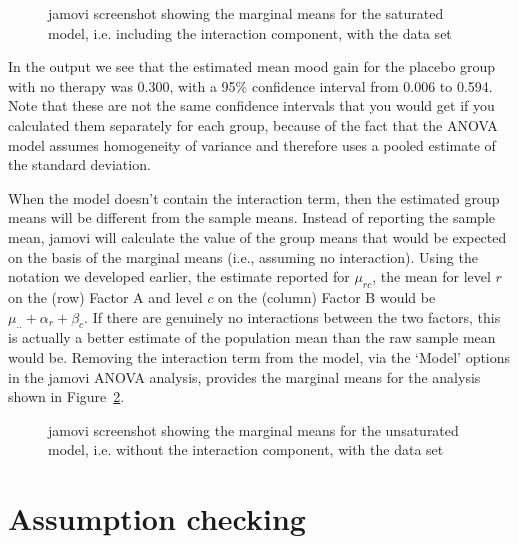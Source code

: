\bigskip
\begin{figure}[!htb]
\begin{center}
\caption{jamovi screenshot showing the marginal means for the saturated model, i.e. including the interaction component, with the  data set}
\label{fig:margmean1}
\HR
\end{center}
\end{figure}

In the output we see that the estimated mean mood gain for the placebo group with no therapy was 0.300, with a 95\% confidence interval from 0.006 to 0.594. Note that these are not the same confidence intervals that you would get if you calculated them separately for each group, because of the fact that the ANOVA model assumes homogeneity of variance and therefore uses a pooled estimate of the standard deviation. 

When the model doesn't contain the interaction term, then the estimated group means will be different from the sample means. Instead of reporting the sample mean, jamovi will calculate the value of the group means that would be expected on the basis of the marginal means (i.e., assuming no interaction). Using the notation we developed earlier, the estimate reported for $\mu_{rc}$, the mean for level $r$ on the (row) Factor A and level $c$ on the (column) Factor B would be $\mu_{..} + \alpha_r + \beta_c$. If there are genuinely no interactions between the two factors, this is actually a better estimate of the population mean than the raw sample mean would be. Removing the interaction term from the model, via the `Model' options in the jamovi ANOVA analysis, provides the marginal means for the analysis shown in Figure~\ref{fig:margmean2}.

\bigskip
\begin{figure}[!htb]
\begin{center}
\caption{jamovi screenshot showing the marginal means for the unsaturated model, i.e. without the interaction component, with the  data set}
\label{fig:margmean2}
\HR
\end{center}
\end{figure}


\section{Assumption checking~\label{sec:factorialanovaassumptions}} 

